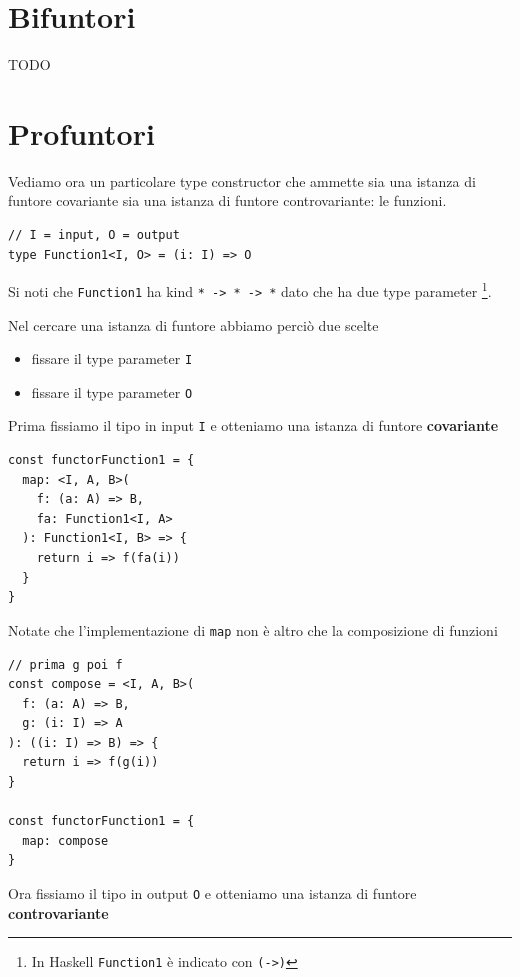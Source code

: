 \documentclass[12pt]{article}
\begin{document}
\newpage

\section{Bifuntori}

TODO

\newpage

\section{Profuntori}

Vediamo ora un particolare type constructor che ammette sia una istanza di funtore covariante sia una istanza di
funtore controvariante: le funzioni.

\begin{verbatim}
// I = input, O = output
type Function1<I, O> = (i: I) => O
\end{verbatim}

Si noti che \texttt{Function1} ha kind \texttt{* -> * -> *} dato che
ha due type parameter \footnote{In Haskell \texttt{Function1} è indicato con \texttt{(->)}}.

Nel cercare una istanza di funtore abbiamo perciò due scelte

\begin{itemize}
\item fissare il type parameter \texttt{I}
\item fissare il type parameter \texttt{O}
\end{itemize}

Prima fissiamo il tipo in input \texttt{I} e otteniamo una istanza di funtore \textbf{covariante}

\begin{verbatim}
const functorFunction1 = {
  map: <I, A, B>(
    f: (a: A) => B,
    fa: Function1<I, A>
  ): Function1<I, B> => {
    return i => f(fa(i))
  }
}
\end{verbatim}

Notate che l'implementazione di \texttt{map} non è altro che la composizione di funzioni

\begin{verbatim}
// prima g poi f
const compose = <I, A, B>(
  f: (a: A) => B,
  g: (i: I) => A
): ((i: I) => B) => {
  return i => f(g(i))
}

const functorFunction1 = {
  map: compose
}
\end{verbatim}

Ora fissiamo il tipo in output \texttt{O} e otteniamo una istanza di funtore \textbf{controvariante}
\end{document}
